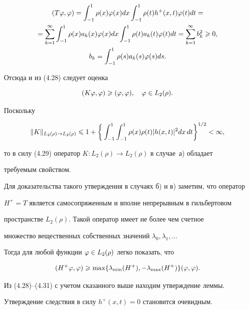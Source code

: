 \begin{pf}
\begin{gather*}


(T\vp,\vp)=\int_{-1}^{1}\rho(x)\vp(x)dx\int_{-1}^1\rho(t)h^+(x,t)\vp(t)dt=\\


=\sum_{k=1}^\infty \int_{-1}^1\rho(x)a_k(x)\vp(x)dx


\int_{-1}^1\rho(t)a_k(t)\vp(t)dt=


\sum_{k=1}^\infty b_k^2 \gea 0,\\


%


b_k=\int_{-1}^1 \rho(s)a_k(s)\vp(s)ds.


\end{gather*}


Отсюда и из (4.28) следует оценка


\begin{equation}


(K\vp,\vp)\gea (\vp,\vp), \quad \vp\in L_2(\rho).


\end{equation}





Поскольку


\begin{equation}


\|K\|_{L_2(\rho)\to L_2(\rho)}\lea 1+\bigg\{


\int_{-1}^1\int_{-1}^1 \rho(x)\rho(t)|h(x,t)|^2dx\,dt


\bigg\}^{1/2}<\infty,


\end{equation}


то в силу (4.29) оператор $K:L_2(\rho)\to L_2(\rho)$ в случае~а) обладает 


требуемым свойством.





Для доказательства  такого утверждения в случаях б) и в) заметим, что оператор 


$H^+=T$ является самосопряженным и вполне непрерывным в гильбертовом 


пространстве $L_2(\rho)$. Такой оператор имеет не более чем счетное 


множество вещественных собственных значений $\lambda_0,\lambda_1,\dotsc$


Тогда для любой функции $\varphi\in L_2(\rho)$ легко показать, что


\begin{equation}


(H^+\vp,\vp)\gea \max\limits\{\lambda_{\min}(H^+),-\lambda_{\max}(H^+)\}(\vp,\vp).


\end{equation}


Из (4.28)--(4.31) с учетом сказанного выше находим утверждение леммы. 


Утверждение следствия в силу $h^+(x,t)=0$ становится очевидным.


\end{pf}








